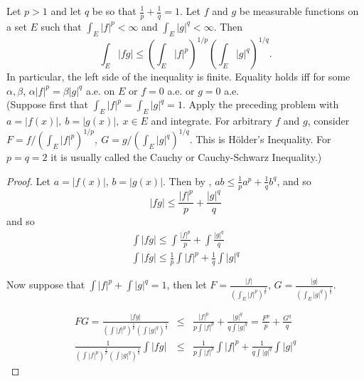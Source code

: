 \begin{pblm}%
	Let $p > 1$ and let $q$ be so that $\frac{1}{p} + \frac{1}{q} = 1$. Let $f$ and $g$ 
	be measurable functions on a set $E$ such that $\int_E |f|^p < \infty$ and 
	$\int_E|g|^q<\infty$. Then 
	\begin{equation*}
		\int_E|fg|\le\left(\int_E|f|^p\right)^{1/p}\left(\int_E|g|^q\right)^{1/q}. 
	\end{equation*}
	In particular, the left side of the inequality is finite. Equality holds iff for some $\alpha, \beta$, 
	$\alpha|f|^p = \beta|g|^q$ a.e. on $E$ or $f = 0$ a.e. or $g=0$ a.e. \\
	{\scriptsize{(Suppose first that $\int_E|f|^p = \int_E|g|^q=1$. Apply the preceding 
	problem with $a=|f(x)|,~b=|g(x)|,~x\in E$ and integrate. For arbitrary $f$ and $g$, 
	consider $F = f/(\int_E|f|^p)^{1/p},~G=g/(\int_E|g|^q)^{1/q}$. This is H\"{o}lder's 
	Inequality. For $p = q = 2$ it is usually called the Cauchy or Cauchy-Schwarz Inequality.)}}
\begin{proof}
	Let $a = |f(x)|$, $b = |g(x)|$. Then by , 
	$ab \le \frac{1}{p}a^p + \frac{1}{q}b^q$, and so 
	\begin{equation*}
		|fg| \le \frac{|f|^p}{p} + \frac{|g|^q}{q}
	\end{equation*}
	and so 
	\begin{equation*}
	\begin{array}{c}
		\int |fg| \le \int \frac{|f|^p}{p} + \int \frac{|g|^q}{q}\\
		\int |fg| \le \frac{1}{p}\int |f|^p + \frac{1}{q}\int |g|^q
	\end{array}
	\end{equation*}

\pagebreak
	Now suppose that $\int |f|^p + \int|g|^q = 1$, then let 
	$F = \frac{|f|}{\left(\int_E|f|^p\right)^\frac{1}{p}}$, 
	$G = \frac{|g|}{\left(\int_E|g|^q\right)^\frac{1}{q}}$.  

	\begin{equation*}
	\begin{array}{rcl}
		FG  = \frac{|fg|}{\left(\int|f|^p\right)^\frac{1}{p}\left(\int|g|^q\right)^\frac{1}{q}} & \le & 
			\frac{|f|^p}{p\int|f|^p} + \frac{|g|^q}{q\int|g|^q} = \frac{F^p}{p} + \frac{G^q}{q}\\
		\frac{1}{\left(\int|f|^p\right)^\frac{1}{p}\left(\int|g|^q\right)^\frac{1}{q}}\int |fg| & \le & 
			\frac{1}{p\int|f|^p}\int|f|^p + \frac{1}{q\int|g|^q}\int |g|^q
	\end{array}
	\end{equation*}



\end{proof}
\end{pblm}
